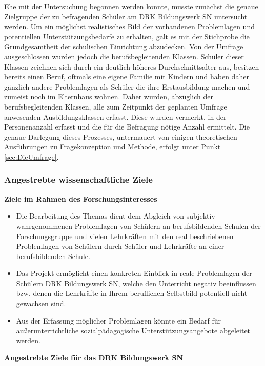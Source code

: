 Ehe mit der Untersuchung begonnen werden konnte, musste zunächst die genaue Zielgruppe der zu befragenden Schüler am DRK Bildungswerk SN untersucht werden. Um ein möglichst realistisches Bild der vorhandenen Problemlagen und potentiellen Unterstützungsbedarfe zu erhalten, galt es mit der Stichprobe die Grundgesamtheit der schulischen Einrichtung abzudecken. Von der Umfrage ausgeschlossen wurden jedoch die berufsbegleitenden Klassen. Schüler dieser Klassen zeichnen sich durch ein deutlich höheres Durchschnittsalter aus, besitzen bereits einen Beruf, oftmals eine eigene Familie mit Kindern und haben daher gänzlich andere Problemlagen als Schüler die ihre Erstausbildung machen und zumeist noch im Elternhaus wohnen. Daher wurden, abzüglich der berufsbegleitenden Klassen, alle zum Zeitpunkt der geplanten Umfrage anwesenden Ausbildungsklassen erfasst. Diese wurden vermerkt, in der Personenanzahl erfasst und die für die Befragung nötige Anzahl ermittelt. Die genaue Darlegung dieses Prozesses, untermauert von einigen theoretischen Ausführungen zu Fragekonzeption und Methode, erfolgt unter Punkt \ref{sec:DieUmfrage}. 

\subsubsection{Angestrebte wissenschaftliche Ziele}
\label{sec:AngestrebteWissenschaftlicheZiele}

\textbf{Ziele im Rahmen des Forschungsinteresses}

\begin{itemize}
	\item Die Bearbeitung des Themas dient dem Abgleich von subjektiv wahrgenommenen Problemlagen von Schülern an berufsbildenden Schulen der Forschungsgruppe und vielen Lehrkräften mit den real beschriebenen Problemlagen von Schülern durch Schüler und Lehrkräfte an einer berufsbildenden Schule.
	\item Das Projekt ermöglicht einen konkreten Einblick in reale Problemlagen der Schülern DRK Bildungswerk SN, welche den Unterricht negativ beeinflussen bzw. denen die Lehrkräfte in Ihrem beruflichen Selbstbild potentiell nicht gewachsen sind.
	\item Aus der Erfassung möglicher Problemlagen könnte ein Bedarf für außerunterrichtliche sozialpädagogische Unterstützungsangebote abgeleitet werden.
\end{itemize}

\noindent
\textbf{Angestrebte Ziele für das DRK Bildungswerk SN}
 
